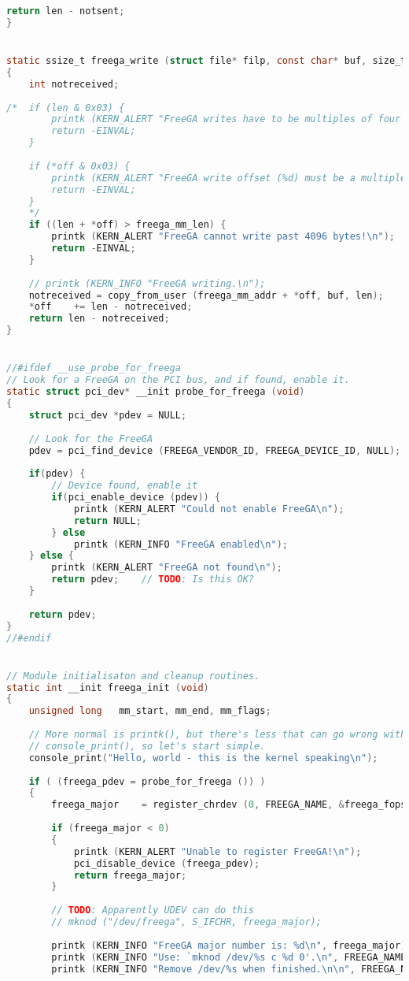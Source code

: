 \begin{lstlisting}[language=C]
	return len - notsent;
}


static ssize_t freega_write (struct file* filp, const char* buf, size_t len, loff_t* off)
{
	int	notreceived;
	
/*	if (len & 0x03) {
		printk (KERN_ALERT "FreeGA writes have to be multiples of four bytes!\n");
		return -EINVAL;
	}
	
	if (*off & 0x03) {
		printk (KERN_ALERT "FreeGA write offset (%d) must be a multiple of four bytes!\n", (int)*off);
		return -EINVAL;
	}
	*/
	if ((len + *off) > freega_mm_len) {
		printk (KERN_ALERT "FreeGA cannot write past 4096 bytes!\n");
		return -EINVAL;
	}
	
	// printk (KERN_INFO "FreeGA writing.\n");
	notreceived = copy_from_user (freega_mm_addr + *off, buf, len);
	*off	+= len - notreceived;
	return len - notreceived;
}


//#ifdef __use_probe_for_freega
// Look for a FreeGA on the PCI bus, and if found, enable it.
static struct pci_dev* __init probe_for_freega (void)
{
	struct pci_dev *pdev = NULL;
	
	// Look for the FreeGA
	pdev = pci_find_device (FREEGA_VENDOR_ID, FREEGA_DEVICE_ID, NULL);
	
	if(pdev) {
		// Device found, enable it
		if(pci_enable_device (pdev)) {
			printk (KERN_ALERT "Could not enable FreeGA\n");
			return NULL;
		} else
			printk (KERN_INFO "FreeGA enabled\n");
	} else {
		printk (KERN_ALERT "FreeGA not found\n");
		return pdev;	// TODO: Is this OK?
	}
	
	return pdev;
}
//#endif


// Module initialisaton and cleanup routines.
static int __init freega_init (void)
{
	unsigned long	mm_start, mm_end, mm_flags;
	
	// More normal is printk(), but there's less that can go wrong with 
	// console_print(), so let's start simple.
	console_print("Hello, world - this is the kernel speaking\n");
	
	if ( (freega_pdev = probe_for_freega ()) )
	{
		freega_major	= register_chrdev (0, FREEGA_NAME, &freega_fops);
		
		if (freega_major < 0)
		{
			printk (KERN_ALERT "Unable to register FreeGA!\n");
			pci_disable_device (freega_pdev);
			return freega_major;
		}
		
		// TODO: Apparently UDEV can do this
		// mknod ("/dev/freega", S_IFCHR, freega_major);
		
		printk (KERN_INFO "FreeGA major number is: %d\n", freega_major);
		printk (KERN_INFO "Use: `mknod /dev/%s c %d 0'.\n", FREEGA_NAME, freega_major);
		printk (KERN_INFO "Remove /dev/%s when finished.\n\n", FREEGA_NAME);
		

\end{lstlisting}
